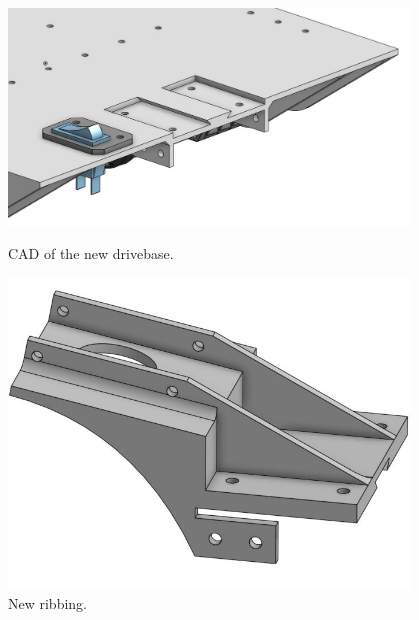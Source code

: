 \begin{figure}[ht]
\centering
\begin{minipage}[b]{.48\textwidth}
  \centering
  \includegraphics[width=0.95\textwidth]{Meetings/October/10-15-21/10-15-21_CAD_Figure1 - Nathan Forrer.JPG}
  \caption{CAD of the new drivebase.}
  \label{fig:101521_1}
\end{minipage}%
\hfill%
\begin{minipage}[b]{.48\textwidth}
  \centering
  \includegraphics[width=0.95\textwidth]{Meetings/October/10-15-21/10-15-21_CAD_Figure2 - Nathan Forrer.JPG}
  \caption{New ribbing.}
  \label{fig:101521_2}
\end{minipage}
\end{figure}

